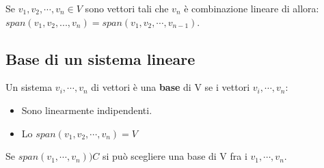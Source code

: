 \begin{proposition}
Se $v_1, v_2, \cdots, v_n \in V$ sono vettori tali che $v_n$ è combinazione lineare di allora: $span(v_1, v_2, ..., v_n) = span(v_1, v_2, \cdots, v_{n-1})$.
\end{proposition}

\subsection{Base di un sistema lineare}
\begin{definition}
Un sistema $v_i, \cdots, v_n$ di vettori è una \textbf{base} di V se i vettori $v_i, \cdots, v_n$:
\begin{itemize}
    \item Sono linearmente indipendenti.
    \item Lo $span(v_1, v_2, \cdots, v_n) = V$
\end{itemize}
\end{definition}

\begin{corollary}
Se $span(v_1, \cdots, v_n) ) C$ si può scegliere una base di V fra i $v_1, \cdots, v_n$.
\end{corollary}

